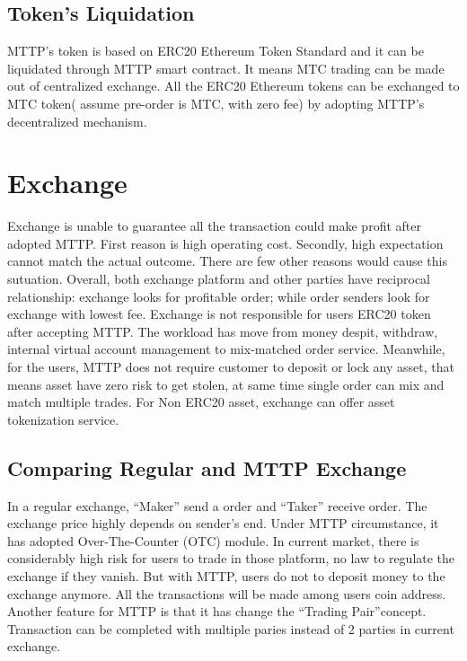 \documentclass[UTF8,nofonts]{article}
\begin{document}

\subsection{Token’s Liquidation}

MTTP’s token is based on ERC20 Ethereum Token Standard and it can be liquidated through MTTP smart contract. It means MTC trading can be made out of centralized exchange. All the ERC20 Ethereum tokens can be exchanged to MTC token( assume pre-order is MTC,  with zero fee) by adopting MTTP’s decentralized mechanism.


\section{Exchange\label{sec: exchange}}

Exchange is unable to guarantee all the transaction could make profit after adopted MTTP. First reason is high operating cost. Secondly,  high expectation cannot match the actual outcome. There are few other reasons would cause this sutuation. Overall,  both exchange platform and other parties have reciprocal relationship: exchange looks for profitable order; while order senders look for exchange with lowest fee.
Exchange is not responsible for users ERC20 token after accepting MTTP. The workload has move from money despit,  withdraw,  internal virtual account management to mix-matched order service. Meanwhile,  for the users,  MTTP does not require customer to deposit or lock any asset, that means asset have zero risk to get stolen, at same time single order can mix and match multiple trades.
For Non ERC20 asset,  exchange can offer asset tokenization service.

\subsection{Comparing Regular and MTTP Exchange}
In a regular exchange,  “Maker” send a order and “Taker” receive order. The exchange price highly depends on sender’s end. Under MTTP circumstance,  it has adopted Over-The-Counter (OTC) module.
In current market,  there is considerably high risk for users to trade in those platform,  no law to regulate the exchange if they vanish. But with MTTP,  users do not to deposit money to the exchange anymore. All the transactions will be made among users coin address.
Another feature for MTTP is that it has change the “Trading Pair”concept. Transaction can be completed with multiple paries instead of 2 parties in current exchange.
\end{document}
